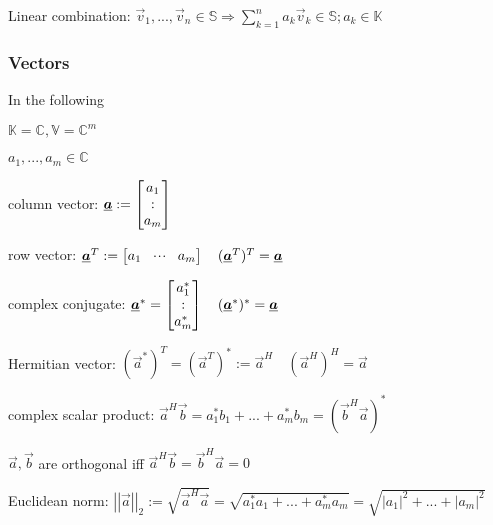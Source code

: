 Linear combination: $\vec{v}_1, ... , \vec{v}_n\in\mathbb{S}\Rightarrow \sum\limits_{k=1}^{n}a_k\vec{v}_k \in \mathbb{S}; a_k\in\mathbb{K}$


\subsubsection{Vectors}
\begin{doublespace}


In the following 

$\mathbb{K}=\mathbb{C}, \mathbb{V}=\mathbb{C}^m$

$a_1,...,a_m\in\mathbb{C}$

column vector: $\underline{\boldsymbol {a}}:=\begin{bmatrix}a_1\\:\\a_m\end{bmatrix} $

row vector: $\underline{\boldsymbol {a}}^T:=\begin{bmatrix}a_1&\!\cdot \!\cdot\!\cdot\!&a_m\end{bmatrix} \quad (\underline{\boldsymbol {a}}^T)^T=\underline{\boldsymbol {a}}$

complex conjugate: $\underline{\boldsymbol {a}}^*=\begin{bmatrix}a_1^*\\:\\a_m^*\end{bmatrix}\quad (\underline{\boldsymbol {a}}^*)^*=\underline{\boldsymbol {a}}$

Hermitian vector: $(\vec{a}^*)^T=(\vec{a}^T)^*:= \vec{a}^H \quad (\vec{a}^H)^H=\vec{a}$

complex scalar product: $\vec{a}^H\vec{b}=a_1^*b_1+...+a_m^*b_m=(\vec{b}^H\vec{a})^*$

$\vec{a},\vec{b}$ are orthogonal iff $\vec{a}^H\vec{b}=\vec{b}^H\vec{a}=0$

Euclidean norm: $\left|\left|\vec{a}\right|\right|_2:=\sqrt{\vec{a}^H\vec{a}}=\sqrt{a_1^*a_1+...+a_m^*a_m}=\sqrt{\left|a_1\right|^2+...+\left|a_m\right|^2}$


\end{doublespace}
